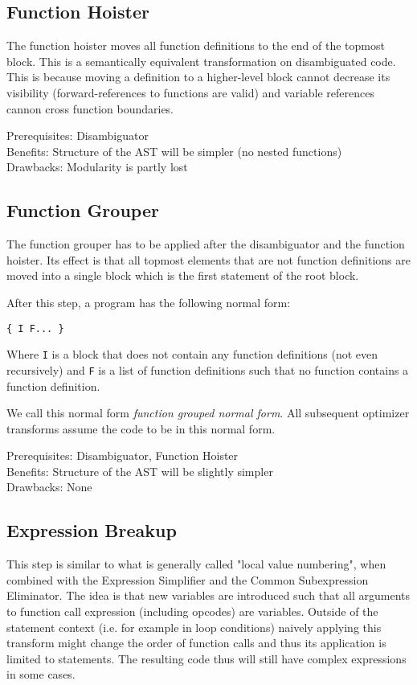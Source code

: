 \documentclass[11pt,letterpaper]{article}
\begin{document}
\subsection{Function Hoister}

The function hoister moves all function definitions to the end of the topmost block. This is
a semantically equivalent transformation on disambiguated code.
This is because moving a definition to a higher-level block cannot decrease
its visibility (forward-references to functions are valid)
and variable references cannon cross function boundaries.

Prerequisites: Disambiguator\\
Benefits: Structure of the AST will be simpler (no nested functions)\\
Drawbacks: Modularity is partly lost

\subsection{Function Grouper}

The function grouper has to be applied after the disambiguator and the function hoister.
Its effect is that all topmost elements that are not function definitions are moved
into a single block which is the first statement of the root block.

After this step, a program has the following normal form:

	\verb|{ I F... }|

Where \texttt{I} is a block that does not contain any function definitions (not even recursively)
and \texttt{F} is a list of function definitions such that no function contains a function definition.

We call this normal form \emph{function grouped normal form}.
All subsequent optimizer transforms assume the code to be in this normal form.

Prerequisites: Disambiguator, Function Hoister\\
Benefits: Structure of the AST will be slightly simpler\\
Drawbacks: None

\subsection{Expression Breakup}

This step is similar to what is generally called "local value numbering", when combined
with the Expression Simplifier and the Common Subexpression Eliminator.
The idea is that new variables are introduced such that all arguments to function call
expression (including opcodes) are variables.
Outside of the statement context (i.e. for example in loop conditions)
naively applying this transform might change the order of function calls and thus
its application is limited to statements. The resulting code thus will still
have complex expressions in some cases.
\end{document}
